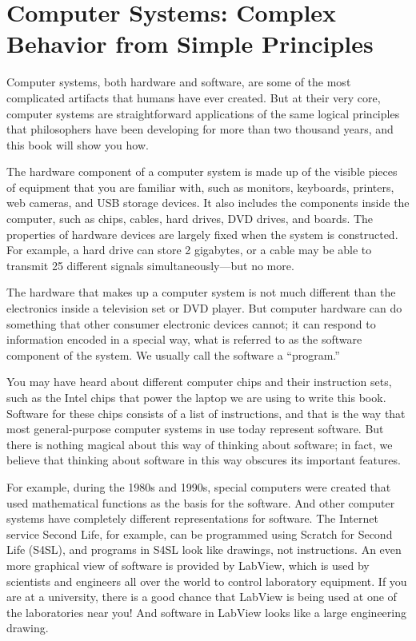 \chapter{Computer Systems: Complex Behavior from Simple Principles}

Computer systems, both hardware and software, are some of the
most complicated artifacts that humans have ever created. But at
their very core, computer systems are straightforward
applications of the same logical principles that philosophers
have been developing for more than two thousand years, and
this book will show you how.

The hardware component of a computer system is made up of the visible
pieces of equipment that you are familiar with, such as monitors,
keyboards, printers, web cameras, and USB storage devices.  It also
includes the
components inside the computer, such as chips, cables, hard
drives, DVD drives, and boards.
The properties of hardware devices are largely fixed when the system is
constructed. For example, a hard drive can store 2 gigabytes,
or a cable may be able to transmit 25 different signals
simultaneously---but no more.

The hardware that makes up a computer system is not much different
than the electronics inside a television set or DVD
player. But computer hardware can do something that other
consumer electronic devices cannot; it can respond to
information encoded in a special way, what is
referred to as the software component of the system.  We usually
call the software a ``program.''

You may have heard
about different computer chips and their instruction sets, such
as the Intel chips that power the laptop we are using to
write this book.  Software for these chips consists of a list of
instructions, and that is the way that most general-purpose computer
systems in use today represent software.
But there is nothing magical about this way of thinking about
software; in fact, we believe that thinking about software in this
way obscures its important features.  

For example, during the 1980s
and 1990s, special computers were created that used mathematical
functions as the basis for the software.  And other computer
systems have completely different representations for software.
The Internet service Second Life, for example, can be programmed
using Scratch for Second Life (S4SL), and programs in S4SL look
like drawings, not instructions.  An even more graphical view of
software is provided by LabView, which is used by scientists and
engineers all over the world to control laboratory equipment.
If you are at a university, there is a good chance
that LabView is being used at one of the laboratories near you!
And software in LabView looks like a large engineering drawing.


